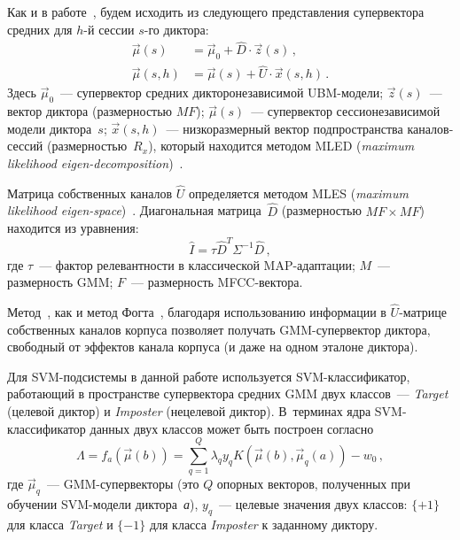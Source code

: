 \begin{multicols}{2}
  Как и в работе~\cite{9b}, будем исходить из сле\-ду\-юще\-го представления 
супервектора средних для $h$-й сессии $s$-го диктора:
  \begin{align*}
  \vec{\mu}(s) &=\vec{\mu}_0+\hat{D}\cdot \vec{z}(s)\,,\\
  \vec{\mu}(s,h) &= \vec{\mu}(s)+\hat{U}\cdot \vec{x}(s,h)\,.
  \end{align*}
  Здесь $\vec{\mu}_0$~--- супервектор средних дикторонезависимой 
UBM-мо\-де\-ли; $\vec{z}(s)$~--- вектор диктора (размерностью $MF$); 
$\vec{\mu}(s)$~--- супервектор сессионезависимой модели диктора~$s$; 
$\vec{x}(s,h)$~--- низкоразмерный вектор подпространства ка\-на\-лов-сес\-сий 
(размерностью~$R_x$), который находится методом MLED (\textit{maximum likelihood 
eigen-decomposition})~\cite{8b}. 
  
  Матрица собственных каналов $\hat{U}$ определяется методом MLES 
(\textit{maximum likelihood eigen-space})~\cite{8b}. Диагональная матрица~$\hat{D}$ 
(размерностью $MF\times MF$) находится из уравнения:
  $$
  \hat{I} = \tau \hat{D}^T\Sigma^{-1}\hat{D}\,,
  $$
где $\tau$~--- фактор релевантности в классической MAP-адап\-та\-ции; $M$~--- 
размерность GMM; $F$~--- размерность MFCC-век\-тора. 
  
  Метод~\cite{9b}, как и метод Фогта~\cite{4b},  благодаря 
использованию информации в $\hat{U}$-мат\-ри\-це собственных каналов 
корпуса позволяет получать GMM-су\-пер\-век\-тор диктора, свободный от эффектов 
канала корпуса (и даже на одном эталоне диктора).
  
  Для SVM-подсистемы в данной работе используется 
  SVM-клас\-си\-фи\-ка\-тор, работающий в пространстве супервектора средних 
GMM двух классов~--- \textit{Target} (целевой диктор) и \textit{Imposter} (нецелевой диктор). 
В~терминах ядра SVM-клас\-си\-фи\-ка\-тор данных двух классов может быть 
построен согласно 
  \begin{equation}
  \Lambda = f_a(\vec{\mu}(b))=\sum\limits_{q=1}^Q \lambda_q y_q 
K(\vec{\mu}(b),\vec{\mu}_q(a))-w_0\,,
  \label{e2b}
  \end{equation}
где $\vec{\mu}_q$~--- GMM-супервекторы (это $Q$ опорных векторов, 
полученных при обучении SVM-мо\-де\-ли диктора~\textit{а}), $y_q$~--- 
целевые значения двух классов: $\{+1\}$ для класса \textit{Target} и $\{-1\}$ для класса 
\textit{Imposter} к заданному диктору. 
  

\end{multicols}
